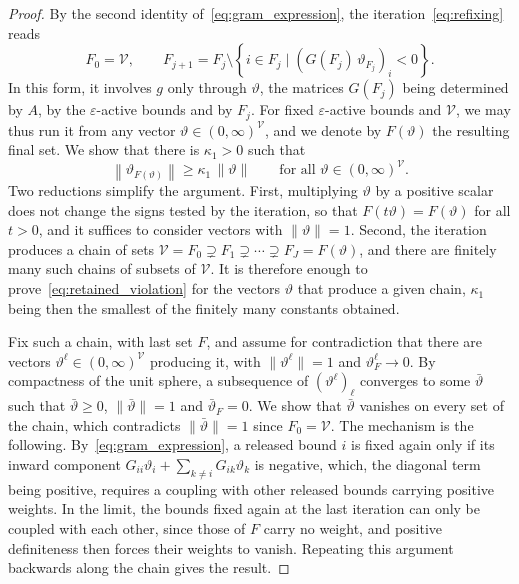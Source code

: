 \documentclass[pdflatex,sn-mathphys-num]{sn-jnl}%
\theoremstyle{thmstyleone}%
\newcommand{\rev}[1]{#1}
\begin{document}
\begin{proof}
	By the second identity of~\eqref{eq:gram_expression}, the iteration~\eqref{eq:refixing} reads
	\[F_0 = \mathcal{V}, \qquad F_{j+1} = F_j \setminus \left\{i \in F_j \mid \left(G(F_j)\,\vartheta_{F_j}\right)_i < 0\right\}.\]
	In this form, it involves $g$ only through $\vartheta$, the matrices $G(F_j)$ being determined by $A$, by the $\varepsilon$-active bounds and by $F_j$. For fixed $\varepsilon$-active bounds and $\mathcal{V}$, we may thus run it from any vector $\vartheta \in (0,\infty)^{\mathcal{V}}$, and we denote by $F(\vartheta)$ the resulting final set. We show that there is $\kappa_1 > 0$ such that
	\begin{equation}\label{eq:retained_violation}
		\left\|\vartheta_{F(\vartheta)}\right\| \ge \kappa_1\,\|\vartheta\| \qquad \text{for all } \vartheta \in (0,\infty)^{\mathcal{V}}.
	\end{equation}
	Two reductions simplify the argument. First, multiplying $\vartheta$ by a positive scalar does not change the signs tested by the iteration, so that $F(t\vartheta) = F(\vartheta)$ for all $t > 0$, and it suffices to consider vectors with $\|\vartheta\| = 1$. Second, the iteration produces a chain of sets $\mathcal{V} = F_0 \supsetneq F_1 \supsetneq \cdots \supsetneq F_J = F(\vartheta)$, and there are finitely many such chains of subsets of $\mathcal{V}$. It is therefore enough to prove~\eqref{eq:retained_violation} for the vectors $\vartheta$ that produce a given chain, $\kappa_1$ being then the smallest of the finitely many constants obtained.

	Fix such a chain, with last set $F$, and assume for contradiction that there are vectors $\vartheta^\ell \in (0,\infty)^{\mathcal{V}}$ producing it, with $\|\vartheta^\ell\| = 1$ and $\vartheta^\ell_F \to 0$. By compactness of the unit sphere, a subsequence of $(\vartheta^\ell)_\ell$ converges to some $\bar\vartheta$ such that $\bar\vartheta \ge 0$, $\|\bar\vartheta\| = 1$ and $\bar\vartheta_F = 0$. We show that $\bar\vartheta$ vanishes on every set of the chain, which contradicts $\|\bar\vartheta\| = 1$ since $F_0 = \mathcal{V}$. The mechanism is the following. By~\eqref{eq:gram_expression}, a released bound $i$ is fixed again only if its inward component $G_{ii}\vartheta_i + \sum_{k\ne i}G_{ik}\vartheta_k$ is \rev{negative, which,} the diagonal term being positive, requires a coupling with other released bounds carrying positive weights. In the limit, the bounds fixed again at the last iteration can only be coupled with each other, since those of $F$ carry no weight, and positive definiteness then forces their weights to vanish. Repeating this argument backwards along the chain gives the result.


\end{proof}
\end{document}
